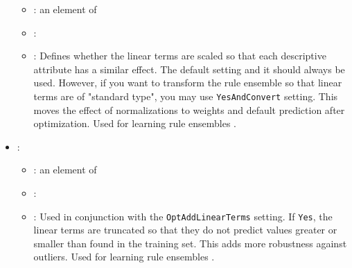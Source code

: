 \begin{itemize}
\begin{itemize}
                \item \optionPossibleValues{}: an element of 
                \item \optionDefaultValue{}: 
                \item \optionDescrption{}: Defines whether the linear terms are scaled so that each descriptive attribute has a similar effect. The default setting  and it should always be used.
                However, if you want to transform the rule ensemble so that linear terms are of "standard type", you may use \texttt{YesAndConvert} setting.
                This moves the effect of normalizations to weights and default prediction after optimization. Used for learning rule ensembles \cite{Aho2009}.
           \end{itemize}
    \item {}:
           \begin{itemize}
                \item \optionPossibleValues{}: an element of 
                \item \optionDefaultValue{}: 
                \item \optionDescrption{}: Used in conjunction with the \texttt{OptAddLinearTerms} setting. If \texttt{Yes}, the linear terms are truncated so that they do not predict values greater or smaller than found in the training set. This adds more robustness against outliers. Used for learning rule ensembles \cite{Aho2009}.
           \end{itemize}
\end{itemize}
